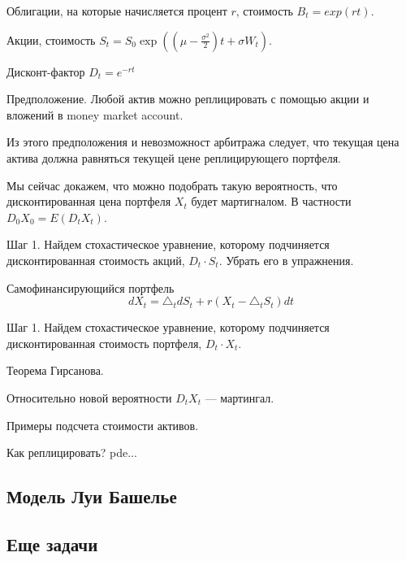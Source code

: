 {Облигации, на которые начисляется процент $r$, стоимость $B_{t}=exp(rt)$.

Акции, стоимость $S_{t}=S_{0}\exp((\mu-\frac{\sigma^{2}}{2})t+\sigma W_{t})$.


Дисконт-фактор $D_t=e^{-rt}$

Предположение. Любой актив можно реплицировать с помощью акции и вложений в money market account.


Из этого предположения и невозможност арбитража следует, что текущая цена актива должна равняться текущей цене реплицирующего портфеля.

Мы сейчас докажем, что можно подобрать такую вероятность, что дисконтированная цена портфеля $X_t$ будет мартигналом. В частности $D_0 X_0=E(D_t X_t)$.



Шаг 1. Найдем стохастическое уравнение, которому подчиняется дисконтированная стоимость акций, $D_t\cdot S_t$. Убрать его в упражнения.

Самофинансирующийся портфель
\begin{equation}
dX_t=\triangle_t dS_t+r(X_t-\triangle_t S_t)dt
\end{equation}

Шаг 1. Найдем стохастическое уравнение, которому подчиняется дисконтированная стоимость портфеля, $D_t\cdot X_t$.


Теорема Гирсанова.

Относительно новой вероятности $D_t X_t$ --- мартингал.


Примеры подсчета стоимости активов.

Как реплицировать? pde...

}\subsection{Модель Луи Башелье} \subsection{Еще задачи}






